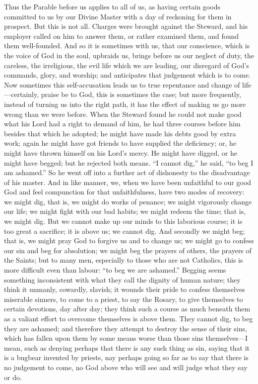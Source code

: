 Thus the Parable before us applies to all of us,
as having certain goods committed to us by our Divine Master with a
day of reckoning for them in prospect. But this is not all. Charges
were brought against the Steward, and his employer called on him to
answer them, or rather examined them, and found them well-founded. And
so it is sometimes with us, that our conscience, which is the voice of
God in the soul, upbraids us, brings before us our neglect of duty,
the careless, the irreligious, the evil life which we are leading, our
disregard of God's commands, glory, and worship; and anticipates that
judgement which is to come. Now sometimes this self-accusation leads
us to true repentance and change of life—certainly, praise be to
God, this is sometimes the case; but more frequently, instead of
turning us into the right path, it has the effect of making us go more
wrong than we were before. When the Steward found he could not make
good what his Lord had a right to demand of him, he had three courses
before him besides that which he adopted; he might have made his debts
good by extra work; again he might have got friends to have supplied
the deficiency; or, he might have thrown himself on his Lord's mercy.
He might have digged, or he might have begged; but he rejected
both means. ``I cannot dig,'' he said, ``to beg I am ashamed.'' So he
went off into a further act of dishonesty to the disadvantage of his
master. And in like manner, we, when we have been unfaithful to our
good God and feel compunction for that unfaithfulness, have two modes
of recovery: we might dig, that is, we might do works of penance; we
might vigorously change our life; we might fight with our bad habits;
we might redeem the time; that is, we might dig. But we cannot make up
our minds to this laborious course; it is too great a sacrifice; it is
above us; we cannot dig. And secondly we might beg; that is, we might
pray God to forgive us and to change us; we might go to confess our
sin and beg for absolution; we might beg the prayers of others, the
prayers of the Saints; but to many men, especially to those who are
not Catholics, this is more difficult even than labour: ``to beg
we are ashamed.'' Begging seems something inconsistent with what they
call the dignity of human nature; they think it unmanly, cowardly,
slavish; it wounds their pride to confess themselves miserable
sinners, to come to a priest, to say the Rosary, to give themselves to
certain devotions, day after day; they think such a course as much
beneath them as a valiant effort to overcome themselves is above them.
They cannot dig, to beg they are ashamed; and therefore they attempt
to destroy the sense of their sins, which has fallen upon them by some
means worse than those sins themselves—I mean, such as denying
perhaps that there is any such thing as sin, saying that it is a
bugbear invented by priests, nay perhaps going so far as to say that
there is no judgement to come, no God above who will see and will
judge what they say or do.

